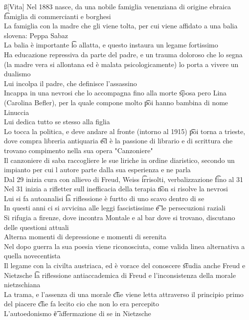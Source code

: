 \documentclass[12pt]{article}
\begin{document}
\ss[Vita]
Nel 1883 nasce, da una nobile famiglia venenziana di origine ebraica \t famiglia di commercianti e borghesi \\
La famiglia con la madre che gli viene tolta, per cui viene affidato a una balia slovena: Peppa Sabaz \\
La balia è importante \t lo allatta, e questo instaura un legame fortissimo \\
Ha educazione repressiva da parte del padre, e un trauma doloroso che lo segna (la madre vera si allontana ed è malata psicologicamente) lo porta a vivere un dualismo \\
Lui incolpa il padre, che definisce l'assassino \\
Incappa in una nevrosi che lo accompagna fino alla morte \t sposa pero Lina (Carolina Befler), per la quale compone molto \t poi hanno bambina di nome Linuccia \\
Lui dedica tutto se stesso alla figlia \\
Lo tocca la politica, e deve andare al fronte (intorno al 1915) \t poi torna a trieste, dove compra libreria antiquaria \t ed è la passione di librario e di scrittura che trovano compimento nella sua opera "Canzoniere" \\
Il canzoniere di saba raccogliere le sue liriche in ordine diaristico, secondo un impianto per cui l autore parte dalla sua esperienza e ne parla \\
Dal 29 inizia cura con allievo di Freud, Weiss \t irrisolti, verbalizzazione \t fino al 31 \\
Nel 31 inizia a rifletter sull inefficacia della terapia \t non si risolve la nevrosi \\
Lui si fa autoanalisi \t la riflessione è furtto di uno scavo dentro di se \\
In questi anni ci si avvicina alle leggi fascistissime \t e le persecuzioni raziali \\
Si rifugia a firenze, dove incontra Montale e al bar dove si trovano, discutano delle questioni attuali \\
Alterna momenti di depressione e momenti di serenita \\
Nel dopo guerra la sua poesia viene riconosciuta, come valida linea alternativa a quella novecentista \\
Il legame con la civilta austriaca, ed è vorace del conoscere \t studia anche Freud e Nietzsche \t la riflessione antiaccademica di Freud e l'inconsistenza della morale nietzschiana \\
La trama, e l'assenza di una morale \t che viene letta attraverso il principio primo del piacere \t che fa lecito cio che non lo era percepito \\
L'autoedonismo \t è affermazione di se in Nietzsche
\end{document}
